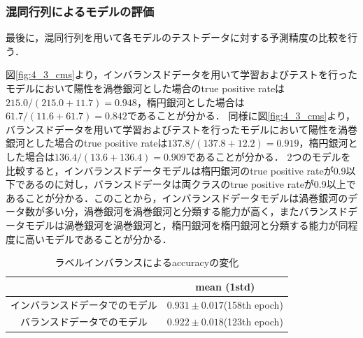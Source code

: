 \documentclass[a4j, 11pt]{jreport}
\begin{document}
\subsubsection{混同行列によるモデルの評価}
最後に，混同行列を用いて各モデルのテストデータに対する予測精度の比較を行う．

図\ref{fig:4_3_cms}より，インバランスドデータを用いて学習およびテストを行ったモデルにおいて陽性を渦巻銀河とした場合のtrue positive rateは$215.0/(215.0+11.7) = 0.948$，楕円銀河とした場合は$61.7/(11.6+61.7) = 0.842$であることが分かる．
同様に図\ref{fig:4_3_cms}より，バランスドデータを用いて学習およびテストを行ったモデルにおいて陽性を渦巻銀河とした場合のtrue positive rateは$137.8/(137.8+12.2) = 0.919$，楕円銀河とした場合は$136.4/(13.6+136.4) = 0.909$であることが分かる．
2つのモデルを比較すると，インバランスドデータモデルは楕円銀河のtrue positive rateが0.9以下であるのに対し，バランスドデータは両クラスのtrue positive rateが0.9以上であることが分かる．このことから，インバランスドデータモデルは渦巻銀河のデータ数が多い分，渦巻銀河を渦巻銀河と分類する能力が高く，またバランスドデータモデルは渦巻銀河を渦巻銀河と，楕円銀河を楕円銀河と分類する能力が同程度に高いモデルであることが分かる．


\begin{table}[H]
  \centering
	\caption{ラベルインバランスによるaccuracyの変化}
  \begin{tabular}{|c|c|}
		\hline
    & mean (1std) \\ \hline
    インバランスドデータでのモデル & $0.931 \pm 0.017$(158th epoch) \\ \hline
    バランスドデータでのモデル & $0.922 \pm 0.018$(123th epoch) \\ \hline
  \end{tabular}
  \label{tb:accs_4.3}
\end{table}
\end{document}
